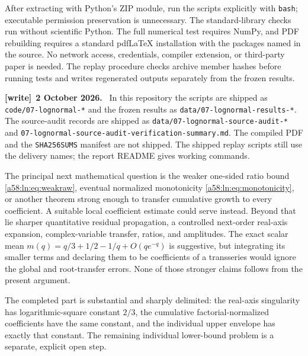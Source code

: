 \documentclass[11pt,letterpaper]{article}
\newcommand{\file}[1]{\nolinkurl{#1}}
\theoremstyle{remark}
\newenvironment{writenote}[1][]{\par\smallskip\begingroup\small
 \noindent\textbf{[write]}\if\relax\detokenize{#1}\relax\else~\textbf{#1.}\fi\ }%
 {\par\endgroup\smallskip}
\begin{document}
After extracting with Python's ZIP module, run the scripts explicitly
with \texttt{bash}; executable permission preservation is unnecessary.
The standard-library checks run without scientific Python. The full
numerical test requires NumPy, and PDF rebuilding requires a standard
pdfLaTeX installation with the packages named in the source. No network
access, credentials, compiler extension, or third-party paper is needed.
The replay procedure checks archive member hashes before running tests
and writes regenerated outputs separately from the frozen results.
\begin{writenote}[2 October 2026]
In this repository the scripts are shipped as \file{code/07-lognormal-*} and the frozen results as \file{data/07-lognormal-results-*}. The source-audit records are shipped as \file{data/07-lognormal-source-audit-*} and \file{07-lognormal-source-audit-verification-summary.md}. The compiled PDF and the \texttt{SHA256SUMS} manifest are not shipped. The shipped replay scripts still use the delivery names; the report README gives working commands.
\end{writenote}

The principal next mathematical question is the weaker one-sided ratio
bound \eqref{a58:ln:eq:weakraw}, eventual normalized monotonicity
\eqref{a58:ln:eq:monotonicity}, or another theorem strong enough
to transfer cumulative growth to every coefficient. A suitable local
coefficient estimate could serve instead. Beyond that lie sharper quantitative
residual propagation, a controlled next-order real-axis expansion,
complex-variable transfer, ratios, and amplitudes. The exact scalar mean
$m(q)=q/3+1/2-1/q+O(qe^{-q})$ is suggestive, but integrating its smaller
terms and declaring them to be coefficients of a transseries would
ignore the global and root-transfer errors. None of those stronger
claims follows from the present argument.

The completed part is substantial and sharply delimited: the real-axis
singularity has logarithmic-square constant $2/3$, the cumulative
factorial-normalized coefficients have the same constant, and the
individual upper envelope has exactly that constant. The remaining
individual lower-bound problem is a separate, explicit open step.

\clearpage
\end{document}
